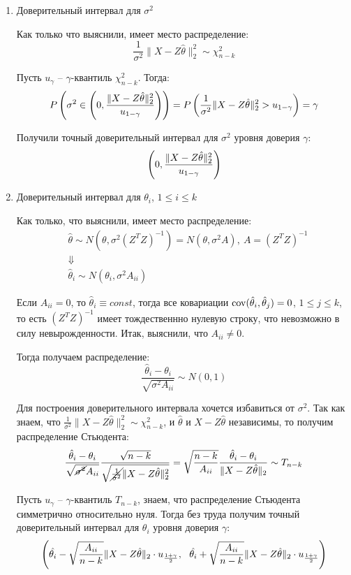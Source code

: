 \begin{enumerate}
    \item Доверительный интервал для $\sigma^2$

    Как только что выяснили, имеет место распределение:
    \[
        \frac{1}{\sigma^2} \|X - Z\hat{\theta}\|_2^2 \sim \chi^2_{n-k}
    \]

    Пусть $u_\gamma$ -- $\gamma$-квантиль $\chi^2_{n-k}$. Тогда:
    \[
        P\left(\sigma^2 \in \left(0, \frac{\|X - Z\hat{\theta}\|_2^2}{u_{1-\gamma}}\right)\right) = P\left(\frac{1}{\sigma^2} \|X - Z\hat{\theta}\|_2^2 > u_{1-\gamma}\right) = \gamma
    \]

    Получили точный доверительный интервал для $\sigma^2$ уровня доверия $\gamma$:
    \[
        \left(0, \frac{\|X - Z\hat{\theta}\|_2^2}{u_{1-\gamma}}\right)
    \]

    \item Доверительный интервал для $\theta_i$, $1\le i \le k$

    Как только, что выяснили, имеет место распределение:
    \begin{align*}
        & \hat{\theta} \sim N(\theta, \sigma^2 (Z^T Z)^{-1}) = N(\theta, \sigma^2 A),\ A = (Z^T Z)^{-1}
        \\
        & \Downarrow
        \\
        & \hat{\theta}_i \sim N(\theta_i, \sigma^2 A_{ii})
    \end{align*}

    Если $A_{ii} = 0$, то $\hat{\theta}_i \equiv const$, тогда все ковариации $\operatorname{cov}(\hat{\theta}_i, \hat{\theta}_j) = 0$, $1 \le j \le k$, то есть $(Z^T Z)^{-1}$ имеет тождественнно нулевую строку, что невозможно в силу невырожденности. Итак, выяснили, что $A_{ii} \neq 0$.

    Тогда получаем распределение:
    \[
        \frac{\hat{\theta}_i - \theta_i}{\sqrt{\sigma^2 A_{ii}}} \sim N(0, 1)
    \]

    Для построения доверительного интервала хочется избавиться от $\sigma^2$. Так как знаем, что $\frac{1}{\sigma^2} \|X - Z\hat{\theta}\|_2^2 \sim \chi^2_{n-k}$, и $\hat{\theta}$ и $X - Z\hat{\theta}$ независимы, то получим распределение Стьюдента:
    \[
        \frac{\hat{\theta}_i - \theta_i}{\sqrt{\cancel{\sigma^2} A_{ii}}} \frac{\sqrt{n-k}}{\sqrt{\cancel{\frac{1}{\sigma^2}} \|X - Z\hat{\theta}\|_2^2}} = \sqrt{\frac{n-k}{A_{ii}}} \frac{\hat{\theta}_i - \theta_i}{\|X - Z\hat{\theta}\|_2} \sim T_{n-k}
    \]
        
    Пусть $u_\gamma$ -- $\gamma$-квантиль $T_{n-k}$, знаем, что распределение Стьюдента симметрично относительно нуля. Тогда без труда получим точный доверительный интервал для $\theta_i$ уровня доверия $\gamma$:
    \[
        \left(\hat{\theta_i} - \sqrt{\frac{A_{ii}}{n-k}} \|X - Z\hat{\theta}\|_2 \cdot u_{\frac{1+\gamma}{2}},\ \ \hat{\theta_i} + \sqrt{\frac{A_{ii}}{n-k}} \|X - Z\hat{\theta}\|_2 \cdot u_{\frac{1+\gamma}{2}}\right)
    \]


\end{enumerate}
